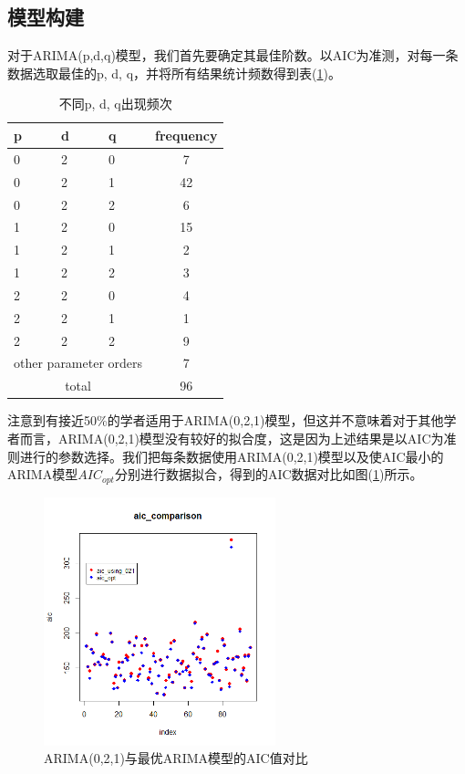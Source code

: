 \documentclass[lang=cn,11pt,a4paper,cite=authoryear]{elegantpaper}
\begin{document}
\subsection{模型构建}

对于ARIMA(p,d,q)模型，我们首先要确定其最佳阶数。以AIC为准测，对每一条数据选取最佳的p, d, q，并将所有结果统计频数得到表(\ref{tab4})。

\begin{table}[H]
	\centering
	\caption{不同p, d, q出现频次}
	\label{tab4}
	\begin{tabular}{p{1cm}p{1cm}p{1cm}c}
		\hline
		p            & d            & q            & frequency \\ \hline
		0            & 2            & 0            & 7         \\
		0            & 2            & 1            & 42        \\
		0            & 2            & 2            & 6         \\
		1            & 2            & 0            & 15        \\
		1            & 2            & 1            & 2         \\
		1            & 2            & 2            & 3         \\
		2            & 2            & 0            & 4         \\
		2            & 2            & 1            & 1         \\
		2            & 2            & 2            & 9         \\ \hline
		\multicolumn{3}{c}{other parameter orders} & 7         \\ \hline
		\multicolumn{3}{c}{total}                  & 96        \\ \hline
	\end{tabular}
\end{table}

注意到有接近50\%的学者适用于ARIMA(0,2,1)模型，但这并不意味着对于其他学者而言，ARIMA(0,2,1)模型没有较好的拟合度，这是因为上述结果是以AIC为准则进行的参数选择。我们把每条数据使用ARIMA(0,2,1)模型以及使AIC最小的ARIMA模型$AIC_{opt}$分别进行数据拟合，得到的AIC数据对比如图(\ref{fig7})所示。

\begin{figure}[H]
	\centering
	\includegraphics[width=0.6\textwidth]{image/aic.png}
	\caption{ARIMA(0,2,1)与最优ARIMA模型的AIC值对比}
	\label{fig7}
\end{figure}
\end{document}
